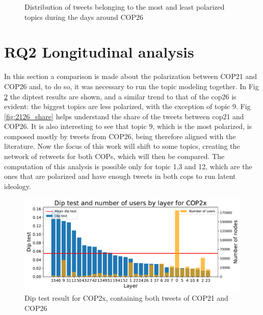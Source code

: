 \begin{figure}[H]
\begin{minipage}{0.50\textwidth}
    \end{minipage}

    \caption{ Distribution of tweets belonging to the most and least polarized topics during the days around COP26}
    \label{fig:ridge_topics}
\end{figure}


\section{RQ2 Longitudinal analysis}

In this section a comparison is made about  the polarization between COP21 and COP26 and, to do so, it was necessary to run the topic modeling together. In Fig \ref{fig:diptesto cop2x} the diptest results are shown, and a similar trend to that of the cop26 is evident: the biggest topics are less polarized, with the exception of topic 9. Fig \ref{fig:2126_share} helps understand the share of the tweets between cop21 and COP26. It is also interesting to see that topic 9, which is the most polarized, is composed mostly by tweets from COP26, being therefore aligned with the literature. Now the focus of this work will shift to some topics, creating the network of retweets for both COPs, which will then be compared. The computation of this analysis is possible only for topic 1,3 and 12, which are the ones that are polarized and have enough tweets in both cops to run latent ideology.


\begin{figure}[H]
    \centering
    \includegraphics[width=0.99\linewidth]{Chapter5//figures/dip_test_COP2x.pdf}
    \caption{Dip test result for COP2x, containing both tweets of COP21 and COP26}
    \label{fig:diptesto cop2x}
\end{figure}

